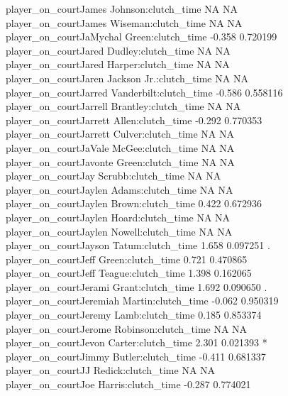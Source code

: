 \documentclass[
  landscape]{article}
\begin{document}
{player\_on\_courtJames Johnson:clutch\_time NA NA\\
player\_on\_courtJames Wiseman:clutch\_time NA NA\\
player\_on\_courtJaMychal Green:clutch\_time -0.358 0.720199\\
player\_on\_courtJared Dudley:clutch\_time NA NA\\
player\_on\_courtJared Harper:clutch\_time NA NA\\
player\_on\_courtJaren Jackson Jr.:clutch\_time NA NA\\
player\_on\_courtJarred Vanderbilt:clutch\_time -0.586 0.558116\\
player\_on\_courtJarrell Brantley:clutch\_time NA NA\\
player\_on\_courtJarrett Allen:clutch\_time -0.292 0.770353\\
player\_on\_courtJarrett Culver:clutch\_time NA NA\\
player\_on\_courtJaVale McGee:clutch\_time NA NA\\
player\_on\_courtJavonte Green:clutch\_time NA NA\\
player\_on\_courtJay Scrubb:clutch\_time NA NA\\
player\_on\_courtJaylen Adams:clutch\_time NA NA\\
player\_on\_courtJaylen Brown:clutch\_time 0.422 0.672936\\
player\_on\_courtJaylen Hoard:clutch\_time NA NA\\
player\_on\_courtJaylen Nowell:clutch\_time NA NA\\
player\_on\_courtJayson Tatum:clutch\_time 1.658 0.097251 .\\
player\_on\_courtJeff Green:clutch\_time 0.721 0.470865\\
player\_on\_courtJeff Teague:clutch\_time 1.398 0.162065\\
player\_on\_courtJerami Grant:clutch\_time 1.692 0.090650 .\\
player\_on\_courtJeremiah Martin:clutch\_time -0.062 0.950319\\
player\_on\_courtJeremy Lamb:clutch\_time 0.185 0.853374\\
player\_on\_courtJerome Robinson:clutch\_time NA NA\\
player\_on\_courtJevon Carter:clutch\_time 2.301 0.021393 *\\
player\_on\_courtJimmy Butler:clutch\_time -0.411 0.681337\\
player\_on\_courtJJ Redick:clutch\_time NA NA\\
player\_on\_courtJoe Harris:clutch\_time -0.287 0.774021\\
}
\end{document}
